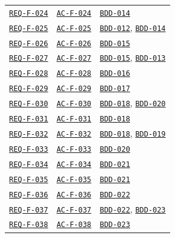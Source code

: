 \documentclass[11pt,a4paper]{article}
\begin{document}
\begin{longtable}{p{3.1cm} p{3.0cm} >{\raggedright\arraybackslash}p{9.1cm}}
\hyperlink{REQ-F-024}{\texttt{REQ-F-024}} & \hyperlink{AC-F-024}{\texttt{AC-F-024}} & \hyperlink{BDD-014}{\texttt{BDD-014}} \\
\hyperlink{REQ-F-025}{\texttt{REQ-F-025}} & \hyperlink{AC-F-025}{\texttt{AC-F-025}} & \hyperlink{BDD-012}{\texttt{BDD-012}}, \hyperlink{BDD-014}{\texttt{BDD-014}} \\
\hyperlink{REQ-F-026}{\texttt{REQ-F-026}} & \hyperlink{AC-F-026}{\texttt{AC-F-026}} & \hyperlink{BDD-015}{\texttt{BDD-015}} \\
\hyperlink{REQ-F-027}{\texttt{REQ-F-027}} & \hyperlink{AC-F-027}{\texttt{AC-F-027}} & \hyperlink{BDD-015}{\texttt{BDD-015}}, \hyperlink{BDD-013}{\texttt{BDD-013}} \\
\hyperlink{REQ-F-028}{\texttt{REQ-F-028}} & \hyperlink{AC-F-028}{\texttt{AC-F-028}} & \hyperlink{BDD-016}{\texttt{BDD-016}} \\
\hyperlink{REQ-F-029}{\texttt{REQ-F-029}} & \hyperlink{AC-F-029}{\texttt{AC-F-029}} & \hyperlink{BDD-017}{\texttt{BDD-017}} \\
\hyperlink{REQ-F-030}{\texttt{REQ-F-030}} & \hyperlink{AC-F-030}{\texttt{AC-F-030}} & \hyperlink{BDD-018}{\texttt{BDD-018}}, \hyperlink{BDD-020}{\texttt{BDD-020}} \\
\hyperlink{REQ-F-031}{\texttt{REQ-F-031}} & \hyperlink{AC-F-031}{\texttt{AC-F-031}} & \hyperlink{BDD-018}{\texttt{BDD-018}} \\
\hyperlink{REQ-F-032}{\texttt{REQ-F-032}} & \hyperlink{AC-F-032}{\texttt{AC-F-032}} & \hyperlink{BDD-018}{\texttt{BDD-018}}, \hyperlink{BDD-019}{\texttt{BDD-019}} \\
\hyperlink{REQ-F-033}{\texttt{REQ-F-033}} & \hyperlink{AC-F-033}{\texttt{AC-F-033}} & \hyperlink{BDD-020}{\texttt{BDD-020}} \\
\hyperlink{REQ-F-034}{\texttt{REQ-F-034}} & \hyperlink{AC-F-034}{\texttt{AC-F-034}} & \hyperlink{BDD-021}{\texttt{BDD-021}} \\
\hyperlink{REQ-F-035}{\texttt{REQ-F-035}} & \hyperlink{AC-F-035}{\texttt{AC-F-035}} & \hyperlink{BDD-021}{\texttt{BDD-021}} \\
\hyperlink{REQ-F-036}{\texttt{REQ-F-036}} & \hyperlink{AC-F-036}{\texttt{AC-F-036}} & \hyperlink{BDD-022}{\texttt{BDD-022}} \\
\hyperlink{REQ-F-037}{\texttt{REQ-F-037}} & \hyperlink{AC-F-037}{\texttt{AC-F-037}} & \hyperlink{BDD-022}{\texttt{BDD-022}}, \hyperlink{BDD-023}{\texttt{BDD-023}} \\
\hyperlink{REQ-F-038}{\texttt{REQ-F-038}} & \hyperlink{AC-F-038}{\texttt{AC-F-038}} & \hyperlink{BDD-023}{\texttt{BDD-023}} \\

\end{longtable}
\end{document}
